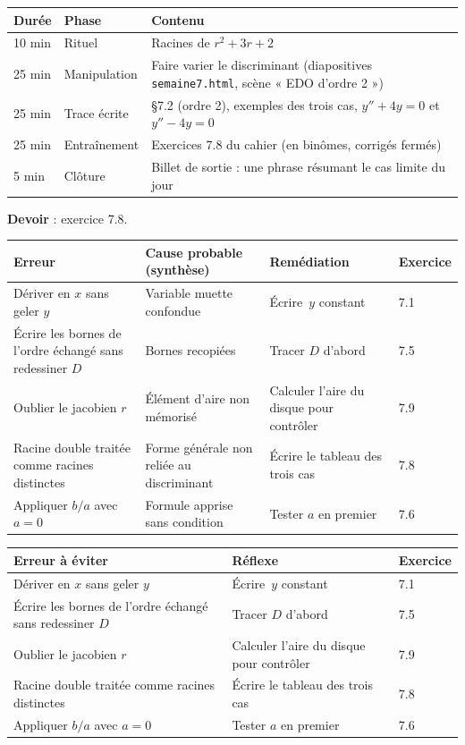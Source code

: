 \documentclass[10.5pt,a4paper]{article}
\newif\ifprof
\providecommand{\og}{\guillemotleft\,}\providecommand{\fg}{\,\guillemotright}
\newcommand{\synth}{\textsf{\textcolor{ardoise}{(synthèse)}}}
\newcommand{\profonly}[1]{\ifprof #1\fi}
\begin{document}
\begin{longtable}{@{}p{1.1cm}p{2.4cm}p{12.4cm}@{}}
\toprule \textbf{Durée} & \textbf{Phase} & \textbf{Contenu}\\ \midrule\endhead
10 min & Rituel & Racines de $r^2+3r+2$\\
25 min & Manipulation & Faire varier le discriminant (diapositives \texttt{semaine7.html}, scène « EDO d'ordre 2 »)\\
25 min & Trace écrite & \S7.2 (ordre 2), exemples des trois cas, $y''+4y=0$ et $y''-4y=0$\\
25 min & Entraînement & Exercices 7.8 du cahier (en binômes, corrigés fermés)\\
5 min & Clôture & Billet de sortie : une phrase résumant le cas limite du jour\\ \bottomrule\end{longtable}\nopagebreak
\textbf{Devoir} : exercice 7.8.\profonly{ \textbf{Point de vigilance} : Racine double : ne pas oublier le facteur $(A+Bt)$.}\par
\ifprof
\begin{longtable}{@{}p{4.8cm}p{3.6cm}p{4.9cm}p{1.6cm}@{}}
\toprule \textbf{Erreur} & \textbf{Cause probable \synth} & \textbf{Remédiation} & \textbf{Exercice}\\ \midrule\endhead
Dériver en $x$ sans geler $y$ & Variable muette confondue & Écrire \og $y$ constant \fg{} & 7.1\\
Écrire les bornes de l'ordre échangé sans redessiner $D$ & Bornes recopiées & Tracer $D$ d'abord & 7.5\\
Oublier le jacobien $r$ & Élément d'aire non mémorisé & Calculer l'aire du disque pour contrôler & 7.9\\
Racine double traitée comme racines distinctes & Forme générale non reliée au discriminant & Écrire le tableau des trois cas & 7.8\\
Appliquer $b/a$ avec $a=0$ & Formule apprise sans condition & Tester $a$ en premier & 7.6\\
\bottomrule\end{longtable}
\else
\begin{longtable}{@{}p{7.2cm}p{7.2cm}p{1.6cm}@{}}
\toprule \textbf{Erreur à éviter} & \textbf{Réflexe} & \textbf{Exercice}\\ \midrule\endhead
Dériver en $x$ sans geler $y$ & Écrire \og $y$ constant \fg{} & 7.1\\
Écrire les bornes de l'ordre échangé sans redessiner $D$ & Tracer $D$ d'abord & 7.5\\
Oublier le jacobien $r$ & Calculer l'aire du disque pour contrôler & 7.9\\
Racine double traitée comme racines distinctes & Écrire le tableau des trois cas & 7.8\\
Appliquer $b/a$ avec $a=0$ & Tester $a$ en premier & 7.6\\
\bottomrule\end{longtable}
\end{document}
